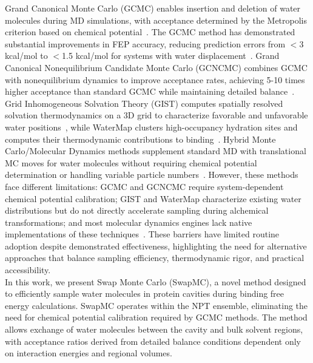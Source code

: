 \documentclass[journal=jacsat,manuscript=article]{achemso}
\begin{document}
Grand Canonical Monte Carlo (GCMC) enables insertion and deletion of water molecules during MD simulations, 
with acceptance determined by the Metropolis criterion based on chemical potential~\cite{ross2015water, ross2020enhancing, Aldeghi2018, Bodnarchuk2014, deng2008computation, Samways2020, Woo2004}.
The GCMC method has demonstrated substantial improvements in FEP accuracy, reducing prediction errors from $<$3 kcal/mol to $<$1.5 kcal/mol for systems with water displacement~\cite{ross2020enhancing}.
Grand Canonical Nonequilibrium Candidate Monte Carlo (GCNCMC) combines GCMC with nonequilibrium dynamics to improve acceptance rates, achieving 5-10 times higher acceptance than standard GCMC while maintaining detailed balance~\cite{Bergazin2020,Ge2022,melling2023enhanced,Deng2024}. 
Grid Inhomogeneous Solvation Theory (GIST) computes spatially resolved solvation thermodynamics on a 3D grid to characterize favorable and unfavorable water positions~\cite{Abel2008,Michel2009,Cao2019,Irwin2019,Eberhardt2023}, 
while WaterMap clusters high-occupancy hydration sites and computes their thermodynamic contributions to binding~\cite{wang2011ligand}. 
Hybrid Monte Carlo/Molecular Dynamics methods supplement standard MD with translational MC moves for water molecules without requiring chemical potential determination or handling variable particle numbers~\cite{BenShalom2019,ben2021fast}. 
However, these methods face different limitations: GCMC and GCNCMC require system-dependent chemical potential calibration; 
GIST and WaterMap characterize existing water distributions but do not directly accelerate sampling during alchemical transformations; 
and most molecular dynamics engines lack native implementations of these techniques~\cite{Samways2020,Cezar2020,Nejahi2021,Nejahi2019}. 
These barriers have limited routine adoption despite demonstrated effectiveness, 
highlighting the need for alternative approaches that balance sampling efficiency, thermodynamic rigor, and practical accessibility.\\
\newline
In this work, we present Swap Monte Carlo (SwapMC), a novel method designed to efficiently sample water molecules in protein cavities during binding free energy calculations. 
SwapMC operates within the NPT ensemble, eliminating the need for chemical potential calibration required by GCMC methods. 
The method allows exchange of water molecules between the cavity and bulk solvent regions, 
with acceptance ratios derived from detailed balance conditions dependent only on interaction energies and regional volumes. 
\end{document}
